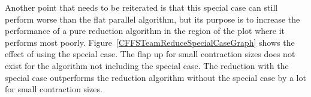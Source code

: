 Another point that needs to be reiterated is that this special case can still
perform worse than the flat parallel algorithm, but its purpose is to increase
the performance of a pure reduction algorithm in the region of the plot where it performs most poorly. Figure~\ref{CFFSTeamReduceSpecialCaseGraph} shows the effect of using the
special case. The flap up for small contraction sizes does not
exist for the algorithm not including the special case. The reduction with the special case outperforms the reduction algorithm without the special case by a lot for 
small contraction sizes.

\begin{figure}
    \centering
	\:
\end{figure}
